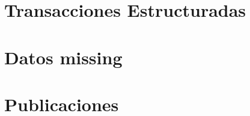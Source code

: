 




\section{Transacciones Estructuradas}
\label{sec:clasificacion:transacciones-tipo-ii}





\section{\carm}
\label{sec:clasificacion:carm}





\section{\Catalogo}
\label{sec:clasificacion:catalogo}





\section{\CC}
\label{sec:clasificacion:catalogo-completo}





\section{Datos missing}
\label{sec:clasificacion:datos-missing}





\section{Publicaciones}
\label{sec:clasificacion:publicaciones}

